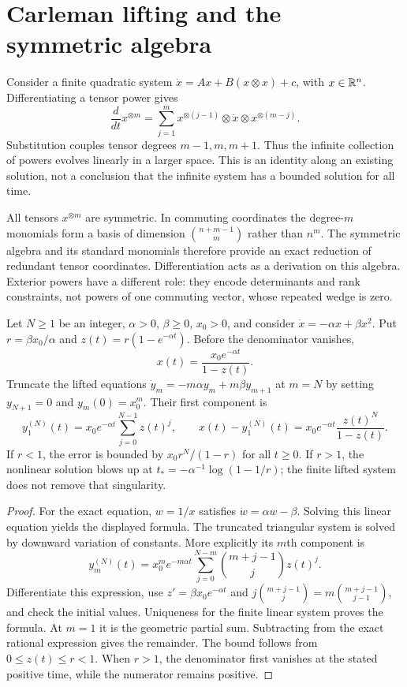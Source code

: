 \section{Carleman lifting and the symmetric algebra}

Consider a finite quadratic system $\dot x=Ax+B(x\otimes x)+c$, with $x\in\mathbb{R}^n$. Differentiating a tensor power gives
\[
 \frac d{dt}x^{\otimes m}
 =\sum_{j=1}^m x^{\otimes(j-1)}\otimes\dot x\otimes x^{\otimes(m-j)}.
\]
Substitution couples tensor degrees $m-1,m,m+1$. Thus the infinite collection of powers evolves linearly in a larger space. This is an identity along an existing solution, not a conclusion that the infinite system has a bounded solution for all time.

All tensors $x^{\otimes m}$ are symmetric. In commuting coordinates the degree-$m$ monomials form a basis of dimension $\binom{n+m-1}{m}$ rather than $n^m$. The symmetric algebra and its standard monomials therefore provide an exact reduction of redundant tensor coordinates. Differentiation acts as a derivation on this algebra. Exterior powers have a different role: they encode determinants and rank constraints, not powers of one commuting vector, whose repeated wedge is zero.

\begin{proposition}
\label{prop:fluid-carleman}
Let $N\ge1$ be an integer, $\alpha>0$, $\beta\ge0$, $x_0>0$, and consider
$\dot x=-\alpha x+\beta x^2$. Put $r=\beta x_0/\alpha$ and $z(t)=r(1-e^{-\alpha t})$. Before the denominator vanishes,
\[
 x(t)=\frac{x_0e^{-\alpha t}}{1-z(t)}.
\]
Truncate the lifted equations
$\dot y_m=-m\alpha y_m+m\beta y_{m+1}$ at $m=N$ by setting $y_{N+1}=0$ and $y_m(0)=x_0^m$. Their first component is
\[
 y_1^{(N)}(t)=x_0e^{-\alpha t}\sum_{j=0}^{N-1}z(t)^j,
 \qquad
 x(t)-y_1^{(N)}(t)=x_0e^{-\alpha t}\frac{z(t)^N}{1-z(t)}.
\]
If $r<1$, the error is bounded by $x_0r^N/(1-r)$ for all $t\ge0$. If $r>1$, the nonlinear solution blows up at $t_*=-\alpha^{-1}\log(1-1/r)$; the finite lifted system does not remove that singularity.
\end{proposition}
\begin{proof}
For the exact equation, $w=1/x$ satisfies $\dot w=\alpha w-\beta$. Solving this linear equation yields the displayed formula. The truncated triangular system is solved by downward variation of constants. More explicitly its $m$th component is
\[
 y_m^{(N)}(t)=x_0^m e^{-m\alpha t}
 \sum_{j=0}^{N-m}\binom{m+j-1}{j}z(t)^j.
\]
Differentiate this expression, use $z'=\beta x_0e^{-\alpha t}$ and
$j\binom{m+j-1}{j}=m\binom{m+j-1}{j-1}$, and check the initial values. Uniqueness for the finite linear system proves the formula. At $m=1$ it is the geometric partial sum. Subtracting from the exact rational expression gives the remainder. The bound follows from $0\le z(t)\le r<1$. When $r>1$, the denominator first vanishes at the stated positive time, while the numerator remains positive.
\end{proof}

